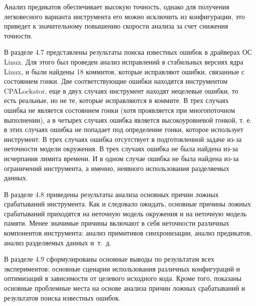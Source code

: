 Анализ предикатов обеспечивает высокую точность, однако для получения легковесного варианта инструмента его можно исключить из конфигурации, это приведет к значительному повышению скорости анализа за счет снижения точности.

В разделе 4.7 представлены результаты поиска известных ошибок в драйверах ОС Linux.
Для этого был проведен анализ исправлений в стабильных версиях ядра Linux, и были найдены 18 коммитов, которые исправляют ошибки, связанные с состоянием гонки.
Две соответствующие ошибки находятся инструментом CPALockator, еще в двух случаях инструмент находят нецелевые ошибки, то есть реальные, но не те, которые исправляются в коммите.
В трех случаях ошибка не является состоянием гонки (хотя проявляется при многопоточном выполнении), а в четырех случаях ошибка является высокоуровневой гонкой, т. е. в этих случаях ошибка не попадает под определение гонки, которое использует инструмент.
В трех случаях ошибка отсутствует в подготовленной задаче из-за неточности модели окружения.
В трех случаях ошибка не была найдена из-за исчерпания лимита времени.
И в одном случае ошибка не была найдена из-за ограничений инструмента, а именно, неявного использования разделяемых данных.

В разделе 4.8 приведены результаты анализа основных причин ложных срабатываний инструмента.
Как и следовало ожидать, основные причины ложных срабатываний приходятся на неточную модель окружения и на неточную модель памяти.
Менее значимые причины включают в себя неточности различных компонентов инструмента: анализ примитивов синхронизации, анализ предикатов, анализ разделяемых данных и~т.~д.

В разделе 4.9 сформулированы основные выводы по результатам всех экспериментов: основные сценарии использования различных конфигураций и оптимизаций в зависимости от целевого исходного кода.
Кроме того, показаны основные проблемные места на основе анализа причин ложных срабатываний и результатов поиска известных ошибок.


